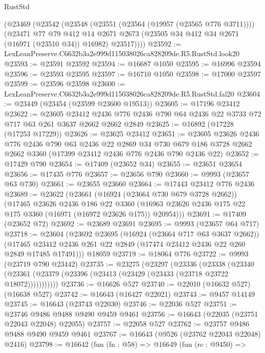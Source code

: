 \begin{lexlean}{RustStd}
\begin{coremodule}
    (@23469
      (@23542
        (@23548
          (@23551 (@23564 (@19957 (@23565 @776 @3711))))
          (@23471
            @77
            @79
            @412
            @14
            @2671
            @2673
            (@23505 @34 @412 @34 @2671 (@16971 (@23510 @34)) @16982)
            @23517))))
@23592 := LexLeanPreserve.C6632b3a2e999d115038026ca828209de.R5.RustStd.look20
@23593 := @23591 @23592
@23594 := @16687 @1050
@23595 := @16996 @23594
@23596 := @23593 @23595
@23597 := @16710 @1050
@23598 := @17000 @23597
@23599 := @23596 @23598
@23600 := LexLeanPreserve.C6632b3a2e999d115038026ca828209de.R5.RustStd.fal20
@23604 := @23449 (@23454 (@23599 @23600 @19513))
@23605 := @17196 @23412
@23622 := @23605
    @23412
    @2436
    @776
    @2436
    @790
    @64
    @2436
    @22
    @3733
    @72
    @717
    @63
    @261
    @3637
    @2662
    @2662
    @2849
@23625 := @16892 (@17228 (@17253 @17229))
@23626 := @23625 @23412
@23651 := @23605
    @23626
    @2436
    @776
    @2436
    @790
    @63
    @2436
    @22
    @2869
    @34
    @730
    @679
    @186
    @3728
    @2662
    @2662
    @3360
    (@17399 @23412 @2436 @776 @2436 @790 @2436 @22)
@23652 := @17429 @790
@23654 := @17409 (@23652 @34)
@23655 := @23651 @23654
@23656 := @17435 @776
@23657 := @23656 @790
@23660 := @9993 (@23657 @63 @730)
@23661 := @23655 @23660
@23664 := @17443 @23412 @776 @2436
@23689 := @23622
    (@23661
      (@16924 (@23664 @730 @679 @3728 @2662))
      (@17465
        @23626
        @2436
        @186
        @22
        @3360
        (@16963 @23626 @2436 @175 @22 @175 @3360 (@16971 (@16972 @23626 @175)) @20954)))
@23691 := @17409 (@23652 @72)
@23692 := @23689 @23691
@23695 := @9993 (@23657 @64 @717)
@23718 := @23604
    (@23692
      @23695
      (@16924 (@23664 @717 @63 @3637 @2662))
      (@17465 @23412 @2436 @261 @22 @2849 (@17474 @23412 @2436 @22 @260 @2849 @17485 @17491)))
    @18059
@23719 := @18064 @776
@23722 := @9993 (@23719 @790 @23442)
@23735 := @23275
    (@23297
      (@23336
        (@23338
          (@23340 (@23361 (@23379 (@23396 (@23413 (@23429 (@23433 (@23718 @23722 @18072)))))))))))
@23736 := @16626 @527
@23740 := @22010 (@16632 @527) (@16638 @527)
@23742 := @16643 (@16427 @22021)
@23743 := @9457 @14149
@23745 := @16643 (@23743 @22030)
@23746 := @22036 @527
@23751 := @23746 @9486 @9488 @9490 @9459 @9461
@23756 := @16643 (@22035 (@23751 @22043 @22048) @22055)
@23757 := @22058 @527
@23762 := @23757 @9486 @9488 @9490 @9459 @9461
@23767 := @16643 (@9526 (@23762 @22043 @22048) @2416)
@23798 := @16642
    (fun (fn : @58) =>
    @16649
      (fun (rc : @9450) =>

\end{coremodule}
\end{lexlean}
